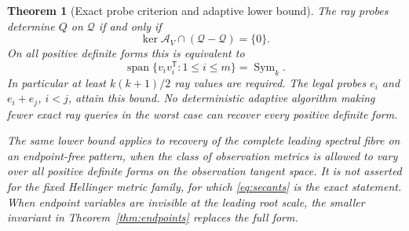 \documentclass[11pt,reqno]{amsart}
\numberwithin{equation}{section}
\newtheorem{theorem}{Theorem}[section]
\theoremstyle{definition}
\theoremstyle{remark}
\newcommand{\Sym}{\operatorname{Sym}}
\newcommand{\Span}{\operatorname{span}}
\newcommand{\cQ}{\mathscr Q}
\begin{document}
\begin{theorem}[Exact probe criterion and adaptive lower bound]\label{thm:queries}
The ray probes determine $Q$ on $\cQ$ if and only if
\begin{equation}\label{eq:secants}
 \ker\mathcal A_V\cap(\cQ-\cQ)=\{0\}.
\end{equation}
On all positive definite forms this is equivalent to
\begin{equation}\label{eq:span}
 \Span\{v_iv_i^{\mathsf T}:1\le i\le m\}=\Sym_k.
\end{equation}
In particular at least $k(k+1)/2$ ray values are required. The legal probes $e_i$ and $e_i+e_j$, $i<j$, attain this bound. No deterministic adaptive algorithm making fewer exact ray queries in the worst case can recover every positive definite form.

The same lower bound applies to recovery of the complete leading spectral fibre on an endpoint-free pattern, when the class of observation metrics is allowed to vary over all positive definite forms on the observation tangent space. It is not asserted for the fixed Hellinger metric family, for which \eqref{eq:secants} is the exact statement. When endpoint variables are invisible at the leading root scale, the smaller invariant in Theorem~\ref{thm:endpoints} replaces the full form.
\end{theorem}
\end{document}
